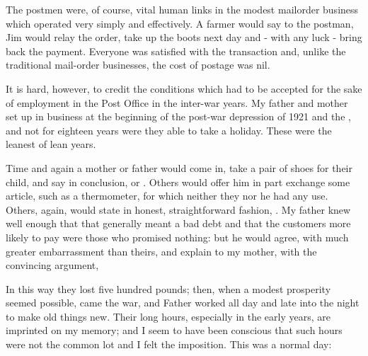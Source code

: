 The postmen were, of course, vital human links in the modest mailorder business which operated very simply and effectively. A farmer  would say to the postman,  Jim would relay the order, take up the boots next day and - with any luck - bring back the payment. Everyone was satisfied with the transaction and, unlike the traditional mail-order businesses, the cost of postage was nil.

It is hard, however, to credit the conditions which had to be accepted for the sake of employment in the Post Office in the inter-war years. My father and mother set up in business at the beginning of the post-war depression of 1921 and the , and not for eighteen years were they able to take a holiday. These were the leanest of lean years.

Time and again a mother or father would come in, take a pair of shoes for their child, and say in conclusion,  or . Others would offer him in part exchange some article, such as a thermometer, for which neither they nor he had any use. Others, again, would state in honest, straightforward fashion, . My father knew well enough that that  generally meant a bad debt and that the customers more likely to pay were those who promised nothing: but he would agree, with much greater embarrassment than theirs, and explain to my mother, with the convincing argument, 

In this way they lost five hundred pounds; then, when a modest prosperity seemed possible, came the war, and Father worked all day and late into the night to make old things new. Their long hours, especially in the early years, are imprinted on my memory; and I seem to have been conscious that such hours were not the common lot and I felt the imposition. This was a normal day: 

